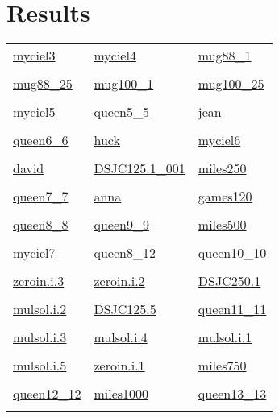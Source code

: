 \documentclass[10pt]{article}
\begin{document}
\section*{Results}
\begin{tabular}{p{4cm} p{4cm} p{4cm}}
\hyperlink{page.9}{myciel3} & \hyperlink{page.10}{myciel4} & \hyperlink{page.11}{mug88\_1} \\ \\
\hyperlink{page.12}{mug88\_25} & \hyperlink{page.13}{mug100\_1} & \hyperlink{page.14}{mug100\_25} \\ \\
\hyperlink{page.15}{myciel5} & \hyperlink{page.16}{queen5\_5} & \hyperlink{page.17}{jean} \\ \\
\hyperlink{page.18}{queen6\_6} & \hyperlink{page.19}{huck} & \hyperlink{page.20}{myciel6} \\ \\
\hyperlink{page.21}{david} & \hyperlink{page.22}{DSJC125.1\_001} & \hyperlink{page.23}{miles250} \\ \\
\hyperlink{page.24}{queen7\_7} & \hyperlink{page.25}{anna} & \hyperlink{page.26}{games120} \\ \\
\hyperlink{page.27}{queen8\_8} & \hyperlink{page.28}{queen9\_9} & \hyperlink{page.29}{miles500} \\ \\
\hyperlink{page.30}{myciel7} & \hyperlink{page.31}{queen8\_12} & \hyperlink{page.32}{queen10\_10} \\ \\
\hyperlink{page.33}{zeroin.i.3} & \hyperlink{page.34}{zeroin.i.2} & \hyperlink{page.35}{DSJC250.1} \\ \\
\hyperlink{page.36}{mulsol.i.2} & \hyperlink{page.37}{DSJC125.5} & \hyperlink{page.38}{queen11\_11} \\ \\
\hyperlink{page.39}{mulsol.i.3} & \hyperlink{page.40}{mulsol.i.4} & \hyperlink{page.41}{mulsol.i.1} \\ \\
\hyperlink{page.42}{mulsol.i.5} & \hyperlink{page.43}{zeroin.i.1} & \hyperlink{page.44}{miles750} \\ \\
\hyperlink{page.45}{queen12\_12} & \hyperlink{page.46}{miles1000} & \hyperlink{page.47}{queen13\_13} \\ \\

\end{tabular}
\end{document}
